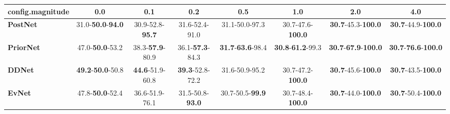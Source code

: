 \begin{tabular}{lccccccc}
\toprule
\textbf{config.magnitude} &                               0.0 &                      0.1 &                      0.2 &                               0.5 &                               1.0 &                                         2.0 &                                         4.0 \\
\midrule
\textbf{PostNet } &  31.0-\textbf{50.0}-\textbf{94.0} &  30.9-52.8-\textbf{95.7} &           31.6-52.4-91.0 &                    31.1-50.0-97.3 &          30.7-47.6-\textbf{100.0} &           \textbf{30.7}-45.3-\textbf{100.0} &           \textbf{30.7}-44.9-\textbf{100.0} \\
\textbf{PriorNet} &           47.0-\textbf{50.0}-53.2 &  38.3-\textbf{57.9}-80.9 &  36.1-\textbf{57.3}-84.3 &  \textbf{31.7}-\textbf{63.6}-98.4 &  \textbf{30.8}-\textbf{61.2}-99.3 &  \textbf{30.7}-\textbf{67.9}-\textbf{100.0} &  \textbf{30.7}-\textbf{76.6}-\textbf{100.0} \\
\textbf{DDNet   } &  \textbf{49.2}-\textbf{50.0}-50.8 &  \textbf{44.6}-51.9-60.8 &  \textbf{39.3}-52.8-72.2 &                    31.6-50.9-95.2 &          30.7-47.2-\textbf{100.0} &           \textbf{30.7}-45.6-\textbf{100.0} &           \textbf{30.7}-43.5-\textbf{100.0} \\
\textbf{EvNet   } &           47.8-\textbf{50.0}-52.4 &           36.6-51.9-76.1 &  31.5-50.8-\textbf{93.0} &           30.7-50.5-\textbf{99.9} &          30.7-48.4-\textbf{100.0} &           \textbf{30.7}-44.0-\textbf{100.0} &           \textbf{30.7}-50.4-\textbf{100.0} \\
\bottomrule
\end{tabular}
